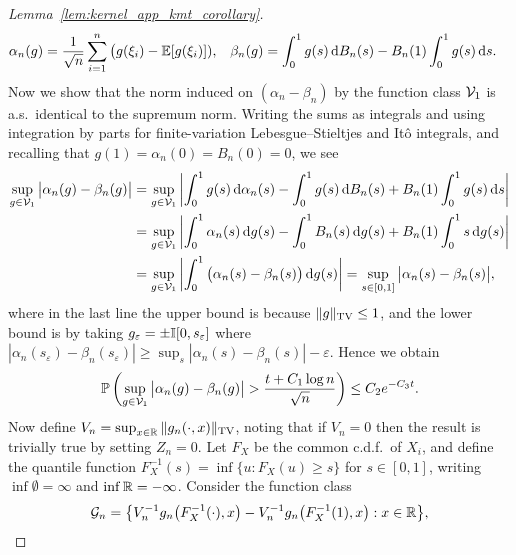 \begin{proof}[Lemma~\ref{lem:kernel_app_kmt_corollary}]
  \begin{align*}
    \alpha_n(g)
    &=
    \frac{1}{\sqrt{n}}
    \sum_{i=1}^n
    \big( g(\xi_i) - \mathbb{E}[g(\xi_i)]),
    &\beta_n(g)
    &= \int_0^1 g(s) \,\mathrm{d}B_n(s)
    - B_n(1) \int_0^1 g(s) \,\mathrm{d}s.
  \end{align*}
  Now we show that the norm induced on
  $(\alpha_n - \beta_n)$
  by the function class $\mathcal{V}_1$ is a.s.\ identical to the
  supremum norm.
  Writing the sums as integrals and using integration by parts
  for finite-variation Lebesgue--Stieltjes and It\^o integrals,
  and recalling that $g(1) = \alpha_n(0) = B_n(0) = 0$,
  we see
  \begin{align*}
    \sup_{g \in \mathcal{V}_1}
    \big|\alpha_n(g) - \beta_n(g)\big|
    &=
    \sup_{g \in \mathcal{V}_1}
    \left|
    \int_0^1 g(s) \,\mathrm{d}\alpha_n(s)
    - \int_0^1 g(s) \,\mathrm{d}B_n(s)
    + B_n(1) \int_0^1 g(s) \,\mathrm{d}s
    \right| \\
    &=
    \sup_{g \in \mathcal{V}_1}
    \left|
    \int_0^1 \alpha_n(s) \,\mathrm{d}g(s)
    - \int_0^1 B_n(s) \,\mathrm{d}g(s)
    + B_n(1) \int_0^1 s \,\mathrm{d}g(s)
    \right| \\
    &=
    \sup_{g \in \mathcal{V}_1}
    \left|
    \int_0^1 \big(\alpha_n(s) - \beta_n(s)\big)
    \,\mathrm{d}g(s)
    \right|
    = \sup_{s \in [0,1]}
    \big|
    \alpha_n(s) - \beta_n(s)
    \big|,
  \end{align*}
  where in the last line
  the upper bound is because $\|g\|_{\mathrm{TV}} \leq 1$,
  and the lower bound is by taking
  $g_\varepsilon = \pm \mathbb{I}[0,s_\varepsilon]$ where
  $|\alpha_n(s_\varepsilon) - \beta_n(s_\varepsilon)|
  \geq \sup_s |\alpha_n(s) - \beta_n(s)| -
  \varepsilon$.
  Hence we obtain
  \begin{align}
    \label{eq:kernel_app_kmt_concentration}
    \mathbb{P}\left(
      \sup_{g \in \mathcal{V}_1}
      \big|\alpha_n(g) - \beta_n(g)\big|
      > \frac{t + C_1\log n}{\sqrt{n}}
    \right)
    \leq C_2 e^{-C_3 t}.
  \end{align}
  Now define $V_n = \sup_{x \in \mathbb{R}} \|g_n(\cdot, x)\|_{\mathrm{TV}}$,
  noting that if $V_n = 0$ then the result is trivially true
  by setting $Z_n = 0$.
  Let $F_X$ be the common c.d.f.\ of $X_i$,
  and define the quantile function
  $F_X^{-1}(s) = \inf \{u: F_X(u) \geq s\}$ for $s \in [0,1]$,
  writing $\inf \emptyset = \infty$
  and $\inf \mathbb{R} = -\infty$.
  Consider the function class
  \begin{align*}
    \cG_n = \big\{
      V_n^{-1} g_n\big(F_X^{-1}(\cdot), x\big)
      - V_n^{-1} g_n\big(F_X^{-1}(1), x\big)
    : x \in \R \big\},

\end{align*}
\end{proof}
